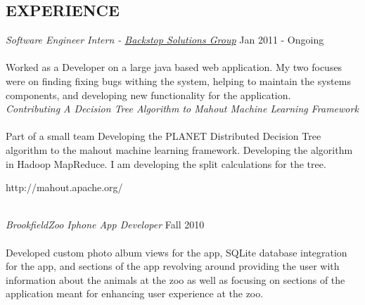 \documentclass[margin]{res}
\newcommand{\tab}{\hspace*{2em}}
\begin{document}
\begin{resume}
                 
\section{EXPERIENCE} 
								{\sl Software Engineer Intern - \href{http://backstopsolutions.com/}{Backstop Solutions Group}} \hfill            Jan 2011 - Ongoing \\ \\
														\tab Worked as a Developer on a large java based web application. My two focuses were on finding 
																 fixing bugs withing the system, helping to maintain the systems components, and developing 
																 new functionality for the application. \\

								{\sl Contributing A Decision Tree Algorithm to Mahout Machine Learning Framework} \\ \\
														\tab Part of a small team Developing the PLANET Distributed Decision Tree algorithm to the mahout 
																 machine learning framework. Developing the algorithm in Hadoop MapReduce. I am developing the
																 split calculations for the tree.\\
														 		 \hoffset\centerline{http://mahout.apache.org/} \\
 
                {\sl BrookfieldZoo Iphone App Developer} \hfill            Fall 2010 \\ \\
														\tab Developed custom photo album views for the app, SQLite database integration for the app, 
																 and sections of the app revolving around providing the user with information about the animals
																 at the zoo as well as focusing on sections of the application meant for enhancing user experience
																 at the zoo. \\
 

\end{resume}
\end{document}
